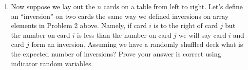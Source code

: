 \documentclass[11pt]{article}
\begin{document}
\begin{enumerate}
\begin{enumerate}
\item Now suppose we lay out the $n$ cards on a table from left to right.  Let's define an ``inversion'' on two cards the same way we defined inversions on array elements in Problem 2 above.  Namely, if card $i$ is to the right of card $j$ but the number on card $i$ is less than the number on card $j$ we will say card $i$ and card $j$ form an inversion.  Assuming we have a randomly shuffled deck what is the expected number of inversions?  Prove your answer is correct using indicator random variables.  

\end{enumerate}




\end{enumerate}
\end{document}
